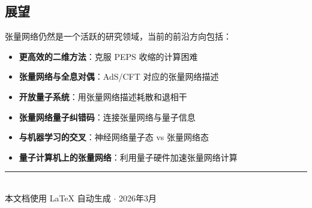\documentclass[12pt,a4paper]{ctexart}
\begin{document}
\subsection{展望}

张量网络仍然是一个活跃的研究领域，当前的前沿方向包括：
\begin{itemize}
    \item \textbf{更高效的二维方法}：克服 PEPS 收缩的计算困难
    \item \textbf{张量网络与全息对偶}：AdS/CFT 对应的张量网络描述
    \item \textbf{开放量子系统}：用张量网络描述耗散和退相干
    \item \textbf{张量网络量子纠错码}：连接张量网络与量子信息
    \item \textbf{与机器学习的交叉}：神经网络量子态 vs 张量网络态
    \item \textbf{量子计算机上的张量网络}：利用量子硬件加速张量网络计算
\end{itemize}

\vfill
\begin{center}
\rule{0.5\textwidth}{0.5pt}\\[0.5em]
{\small 本文档使用 \LaTeX{} 自动生成 \quad $\cdot$ \quad 2026年3月}
\end{center}
\end{document}
